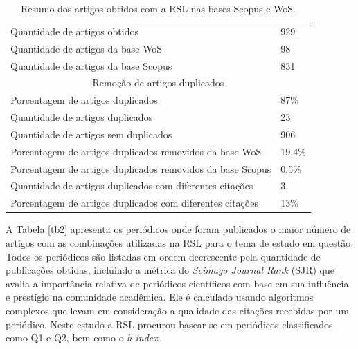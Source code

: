 \begin{table}[!htb]
	\centering
	\caption{Resumo dos artigos obtidos com a RSL nas bases Scopus e WoS.}
	\label{tab:resumo}
	\begin{tabular}{ll}
		\hline
		Quantidade de artigos obtidos & 929 \\
		Quantidade de artigos da base WoS & 98 \\
		Quantidade de artigos da base Scopus & 831 \\
		\hline
		\multicolumn{2}{c}{Remoção de artigos duplicados} \\
		\hline
		Porcentagem de artigos duplicados & 87\% \\
		Quantidade de artigos duplicados & 23 \\
	Quantidade de artigos sem duplicados & 906 \\
		Porcentagem de artigos duplicados removidos da base WoS & 19,4\% \\
		Porcentagem de artigos duplicados removidos da base Scopus & 0,5\% \\
		Quantidade de artigos duplicados com diferentes citações & 3 \\
		Porcentagem de artigos duplicados com diferentes citações & 13\% \\
		\hline
	\end{tabular}
 
\end{table}


A Tabela \ref{tb2} apresenta os periódicos onde foram publicados o maior número de artigos com as combinações utilizadas na RSL para o tema de estudo em questão. Todos os periódicos são listadas em ordem decrescente pela quantidade de publicações obtidas, incluindo a métrica do \textit{Scimago Journal Rank} (SJR) que avalia a importância relativa de periódicos científicos com base em sua influência e prestígio na comunidade acadêmica. Ele é calculado usando algoritmos complexos que levam em consideração a qualidade das citações recebidas por um periódico. Neste estudo a RSL procurou basear-se em periódicos classificados como Q1 e Q2, bem como o \textit{h-index}.

